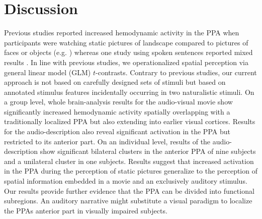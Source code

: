 \documentclass[english]{article}
\begin{document}
\section{Discussion}





Previous studies reported increased hemodynamic activity in the PPA when
participants were watching static pictures of landscape compared to pictures of
faces or objects (e.g. \citep{epstein1998ppa, epstein1999parahippocampal})
whereas one study using spoken sentences reported mixed results
\citep{aziz2008modulation}.
In line with previous studies, we operationalized spatial perception via general
linear model (GLM) $t$-contrasts.
Contrary to previous studies, our current approach is not based on carefully
designed sets of stimuli but based on annotated stimulus features incidentally
occurring in two naturalistic stimuli.
On a group level, whole brain-analysis results for the audio-visual movie show
significantly increased hemodynamic activity spatially overlapping with a
traditionally localized PPA but also extending into earlier visual cortices.
Results for the audio-description also reveal significant activation in the PPA
but restricted to its anterior part.
On an individual level, results of the audio-description show significant
bilateral clusters in the anterior PPA of nine subjects and a unilateral cluster
in one subjects.
Results suggest that increased activation in the PPA during the perception of
static pictures generalize to the perception of spatial information embedded in
a movie and an exclusively auditory stimulus.
Our results provide further evidence that the PPA can be divided into functional
subregions.
An auditory narrative might substitute a visual paradigm to localize the PPAs
anterior part in visually impaired subjects.
\end{document}
